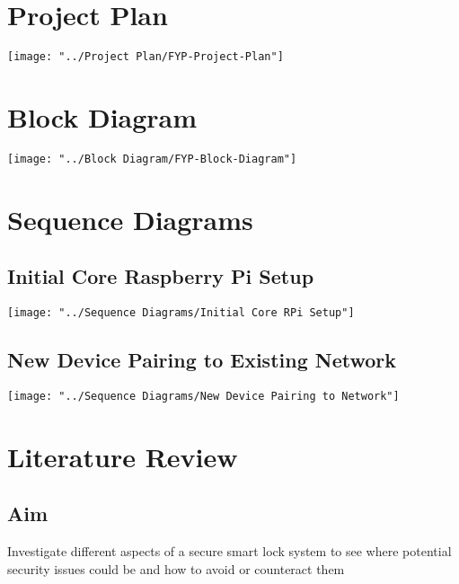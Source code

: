 \documentclass[10pt, a4paper]{article}
\begin{document}
\newpage
\section{Project Plan}
\begin{center}
	\texttt{[image: "../Project Plan/FYP-Project-Plan"]}
\end{center}

\newpage
\section{Block Diagram}
\begin{center}
	\texttt{[image: "../Block Diagram/FYP-Block-Diagram"]}
\end{center}

\newpage
\section{Sequence Diagrams}
\subsection*{Initial Core Raspberry Pi Setup}
\begin{center}
	\texttt{[image: "../Sequence Diagrams/Initial Core RPi Setup"]}
\end{center}

\newpage
\subsection{New Device Pairing to Existing Network}
\begin{center}
	\texttt{[image: "../Sequence Diagrams/New Device Pairing to Network"]}
\end{center}

\newpage
\section{Literature Review}
\subsection{Aim}
Investigate different aspects of a secure smart lock system to see where potential security issues could be and how to avoid or counteract them
\end{document}
